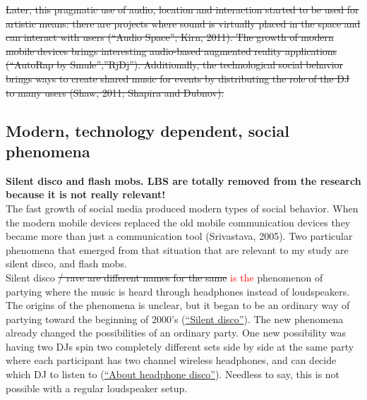 \documentclass[a4paper,11pt]{article}
\begin{document}
\st{Later, this pragmatic use of audio, location and interaction started to be used for artistic means: there are projects where sound is virtually placed in the space and can interact with users (``Audio Space''; Kirn, 2011). The growth of modern mobile devices brings interesting audio-based augmented reality applications (``AutoRap by Smule'',''RjDj''). Additionally, the technological social behavior brings ways to create shared music for events by distributing the role of the DJ to many users (Shaw, 2011; Shapira and Dubnov).}\\


\subsection{Modern, technology dependent, social phenomena}

\textbf{Silent disco and flash mobs. LBS are totally removed from the research because it is not really relevant!}\\

The fast growth of social media produced modern types of social behavior. When the modern mobile devices replaced the old mobile communication devices they became more than just a communication tool (Srivastava, 2005). Two particular phenomena that emerged from that situation that are relevant to my study are silent disco, and flash mobs.\\

Silent disco \st{/ rave are different names for the same} \textcolor{red}{is the} phenomenon of partying where the music is heard through headphones instead of loudspeakers. The origins of the phenomena is unclear, but it began to be an ordinary way of partying toward the beginning of 2000's (\href{http://en.wikipedia.org/wiki/Silent_disco}{``Silent disco''}). The new phenomena already changed the possibilities of an ordinary party. One new possibility was having two DJs spin two completely different sets side by side at the same party where each participant has two channel wireless headphones, and can decide which DJ to listen to (\href{http://headphonedisco.com/about.php}{``About headphone disco''}). Needless to say, this is not possible with a regular loudspeaker setup.\\
\end{document}
